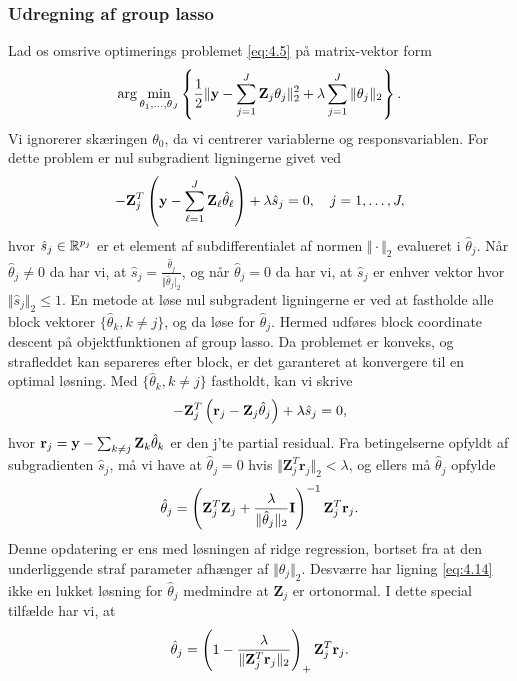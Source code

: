 \subsubsection{Udregning af group lasso}
Lad os omsrive optimerings problemet \eqref{eq:4.5} på matrix-vektor form
\begin{align*}
\arg \min_{\theta_1, \ldots, \theta_J} \cbr{\frac{1}{2} \Vert \y - \sum_{j=1}^J \mathbf{Z}_{j} \theta_j \Vert_2^2 + \lambda \sum_{j=1}^J \Vert \theta_j \Vert_2}.
\end{align*}
Vi ignorerer skæringen $\theta_0$, da vi centrerer variablerne og responsvariablen.
For dette problem er nul subgradient ligningerne givet ved
\begin{align*}
- \mathbf{Z}_{j}^T \del{\y - \sum_{\ell=1}^J \mathbf{Z}_\ell \hat{\theta}_\ell} + \lambda \hat{s}_j = 0, \quad j=1,\ldots, J,
\end{align*} 
hvor $\hat{s}_j \in \mathbb{R}^{p_j}$ er et element af subdifferentialet af normen $\Vert \cdot \Vert_2$ evalueret i $\hat{\theta}_j$.
Når $\hat{\theta}_j \neq 0$ da har vi, at $\hat{s}_j = \frac{\hat{\theta}_j}{\Vert \hat{\theta}_j \vert_2}$, og når $\hat{\theta}_j=0$ da har vi, at $\hat{s}_j$ er enhver vektor hvor $\Vert \hat{s}_j \Vert_2 \leq 1$.
En metode at løse nul subgradent ligningerne er ved at fastholde alle block vektorer $\{\hat{\theta}_k, k \neq j\}$, og da løse for $\hat{\theta}_j$.
Hermed udføres block coordinate descent på objektfunktionen af group lasso.
Da problemet er konveks, og strafleddet kan separeres efter block, er det garanteret at konvergere til en optimal løsning.
Med $\{\hat{\theta}_k, k \neq j\}$ fastholdt, kan vi skrive
\begin{align*}
- \mathbf{Z}_{j}^T \del{\mathbf{r}_j - \mathbf{Z}_j \hat{\theta}_j} + \lambda \hat{s}_j = 0,
\end{align*}
hvor $\mathbf{r}_j = \mathbf{y} - \sum_{k \neq j} \mathbf{Z}_k \hat{\theta}_k $ er den j'te partial residual.
Fra betingelserne opfyldt af subgradienten $\hat{s}_j$, må vi have at $\hat{\theta}_j =0$ hvis $\Vert \mathbf{Z}_j^T \mathbf{r}_j \Vert_2 < \lambda$, og ellers må $\hat{\theta}_j$ opfylde
\begin{align}
\hat{\theta}_j = \del{\mathbf{Z}_j^T \mathbf{Z}_j + \frac{\lambda}{\Vert \hat{\theta}_j \Vert_2} \mathbf{I}}^{-1} \mathbf{Z}_j^T \mathbf{r}_j. \label{eq:4.14}
\end{align}
Denne opdatering er ens med løsningen af ridge regression, bortset fra at den underliggende straf parameter afhænger af $\Vert \hat{\theta}_j \Vert_2$.
Desværre har ligning \eqref{eq:4.14} ikke en lukket løsning for $\hat{\theta}_j$ medmindre at $\mathbf{Z}_j$ er ortonormal. I dette special tilfælde har vi, at
\begin{align*}
\hat{\theta}_j = \del{1 - \frac{\lambda}{\Vert \mathbf{Z}_j^T \mathbf{r}_j \Vert_2}}_+  \mathbf{Z}_j^T \mathbf{r}_j.
\end{align*}

